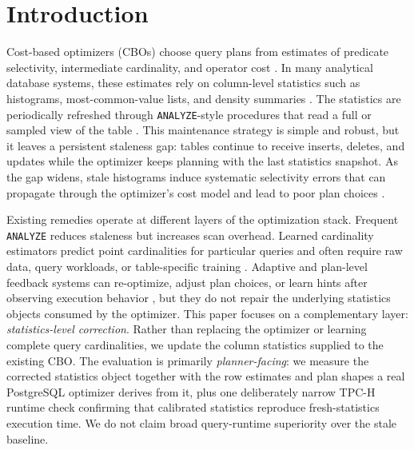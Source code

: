 \documentclass[preprint,12pt]{elsarticle}
\begin{document}
\section{Introduction}
\label{sec:intro}

Cost-based optimizers (CBOs) choose query plans from estimates of predicate
selectivity, intermediate cardinality, and operator cost
\cite{selinger1979access,chaudhuri1998overview}. In many analytical database
systems, these estimates rely on column-level statistics such as histograms,
most-common-value lists, and density summaries
\cite{ioannidis1993histogram,poosala1997selectivity,postgresqlPlannerStats,postgresqlRowEstimation}.
The statistics are periodically refreshed through \texttt{ANALYZE}-style
procedures that read a full or sampled view of the table
\cite{postgresqlAnalyze}. This maintenance strategy is simple and robust,
but it leaves a persistent staleness gap: tables continue to receive inserts,
deletes, and updates while the optimizer keeps planning with the last
statistics snapshot. As the gap widens, stale histograms induce systematic
selectivity errors that can propagate through the optimizer's cost model and
lead to poor plan choices
\cite{leis2015good,moerkotte2009preventing,han2021cardinality,lee2023impact}.

Existing remedies operate at different layers of the optimization stack.
Frequent \texttt{ANALYZE} reduces staleness but increases scan overhead.
Learned cardinality estimators predict point cardinalities for particular
queries and often require raw data, query workloads, or table-specific training
\cite{wang2021ready,sun2021designspace,kim2022learnedstudy,han2021cardinality}.
Adaptive and plan-level feedback
systems can re-optimize, adjust plan choices, or learn hints after observing
execution behavior
\cite{kabra1998efficient,markl2004progressive,stillger2001leo,marcus2019neo,marcus2022bao},
but they do not repair the underlying statistics objects consumed by the
optimizer. This paper focuses on a complementary layer:
\emph{statistics-level correction}. Rather than replacing the optimizer or
learning complete query cardinalities, we update the column statistics supplied
to the existing CBO. The evaluation is primarily \emph{planner-facing}: we
measure the corrected statistics object together with the row estimates and plan
shapes a real PostgreSQL optimizer derives from it, plus one deliberately narrow
TPC-H runtime check confirming that calibrated statistics reproduce
fresh-statistics execution time. We do not claim broad query-runtime superiority
over the stale baseline.
\end{document}
